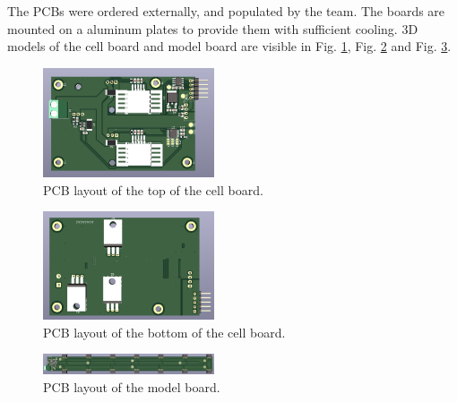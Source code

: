 The PCBs were ordered externally, and populated by the team. The boards are mounted on a aluminum plates to provide them with sufficient cooling. 3D models of the cell board and model board are visible in Fig. \ref{fig:pcb_top_cellboard}, Fig. \ref{fig:pcb_bottom_cellboard}
and Fig. \ref{fig:pcb_modelboard}.
\FloatBarrier
\begin{figure}[h]
    \centering
    \includegraphics[width=0.45\textwidth]{pcb_cell_board_top.png}
    \caption{PCB layout of the top of the cell board.}
    \label{fig:pcb_top_cellboard}
\end{figure}
\FloatBarrier
\begin{figure}[h]
    \centering
    \includegraphics[width=0.45\textwidth]{pcb_cell_board_bottom.png}
    \caption{PCB layout of the bottom of the cell board.}
    \label{fig:pcb_bottom_cellboard}
\end{figure}
\FloatBarrier
\begin{figure}[h]
    \centering
    \includegraphics[width=0.45\textwidth]{pcb_model_board_top.png}
    \caption{PCB layout of the model board.}
    \label{fig:pcb_modelboard}
\end{figure}
\FloatBarrier
